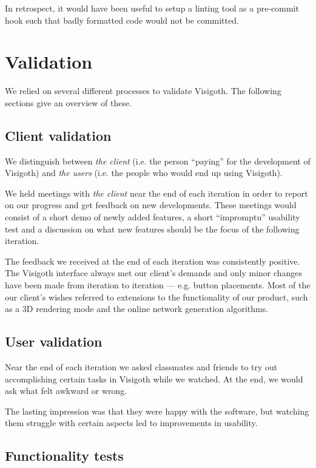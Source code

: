 \documentclass[a4paper,11pt,titlepage]{article}
\let\stdsection\section         %
\renewcommand{\section}{\newpage\stdsection}
\begin{document}
In retrospect, it would have been useful to setup a linting tool as a
pre-commit hook such that badly formatted code would not be committed.

\section{Validation}
\label{validation}

We relied on several different processes to validate Visigoth. The
following sections give an overview of these.

\subsection{Client validation}
We distinguish between \emph{the client} (i.e. the person ``paying''
for the development of Visigoth) and \emph{the users} (i.e. the people
who would end up using Visigoth).

We held meetings with \emph{the client} near the end of each iteration
in order to report on our progress and get feedback on new
developments. These meetings would consist of a short demo of newly
added features, a short ``impromptu'' usability test and a discussion
on what new features should be the focus of the following iteration.

The feedback we received at the end of each iteration was consistently
positive. The Visigoth interface always met our client's demands and
only minor changes have been made from iteration to iteration ---
e.g. button placements. Most of the our client's wishes referred to
extensions to the functionality of our product, such as a 3D rendering
mode and the online network generation algorithms.

\subsection{User validation}
Near the end of each iteration we asked classmates and friends to try
out accomplishing certain tasks in Visigoth while we watched. At the
end, we would ask what felt awkward or wrong.

The lasting impression was that they were happy with the software, but
watching them struggle with certain aspects led to improvements in
usability.

\subsection{Functionality tests}
\label{tests}
\end{document}
